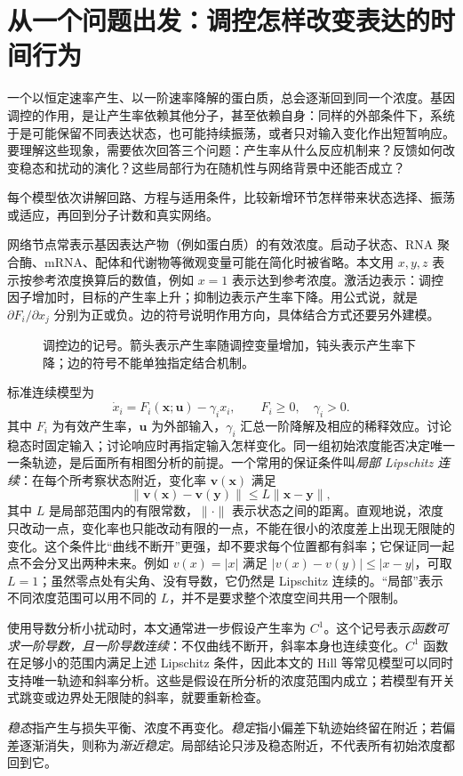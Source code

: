 \chapter{从一个问题出发：调控怎样改变表达的时间行为}
一个以恒定速率产生、以一阶速率降解的蛋白质，总会逐渐回到同一个浓度。基因调控的作用，是让产生率依赖其他分子，甚至依赖自身：同样的外部条件下，系统于是可能保留不同表达状态，也可能持续振荡，或者只对输入变化作出短暂响应。要理解这些现象，需要依次回答三个问题：产生率从什么反应机制来？反馈如何改变稳态和扰动的演化？这些局部行为在随机性与网络背景中还能否成立？

每个模型依次讲解回路、方程与适用条件，比较新增环节怎样带来状态选择、振荡或适应，再回到分子计数和真实网络。

网络节点常表示基因表达产物（例如蛋白质）的有效浓度。启动子状态、RNA 聚合酶、mRNA、配体和代谢物等微观变量可能在简化时被省略。本文用 $x,y,z$ 表示按参考浓度换算后的数值，例如 $x=1$ 表示达到参考浓度。激活边表示：调控因子增加时，目标的产生率上升；抑制边表示产生率下降。用公式说，就是 $\partial F_i/\partial x_j$ 分别为正或负。边的符号说明作用方向，具体结合方式还要另外建模。

\begin{figure}[H]\centering
{}
\caption{调控边的记号。箭头表示产生率随调控变量增加，钝头表示产生率下降；边的符号不能单独指定结合机制。}\label{fig:signs}
\end{figure}

标准连续模型为
\begin{equation}\dot x_i=F_i(\bm{x};\bm{u})-\gamma_i x_i,\qquad F_i\geq0,\quad\gamma_i>0.\end{equation}
其中 $F_i$ 为有效产生率，$\bm u$ 为外部输入，$\gamma_i$ 汇总一阶降解及相应的稀释效应。讨论稳态时固定输入；讨论响应时再指定输入怎样变化。同一组初始浓度能否决定唯一一条轨迹，是后面所有相图分析的前提。一个常用的保证条件叫\emph{局部 Lipschitz 连续}：在每个所考察状态附近，变化率 $\bm v(\bm x)$ 满足
\[
\|\bm v(\bm x)-\bm v(\bm y)\|\leq L\|\bm x-\bm y\|,
\]
其中 $L$ 是局部范围内的有限常数，$\|\cdot\|$ 表示状态之间的距离。直观地说，浓度只改动一点，变化率也只能改动有限的一点，不能在很小的浓度差上出现无限陡的变化。这个条件比“曲线不断开”更强，却不要求每个位置都有斜率；它保证同一起点不会分叉出两种未来。例如 $v(x)=|x|$ 满足 $|v(x)-v(y)|\leq|x-y|$，可取 $L=1$；虽然零点处有尖角、没有导数，它仍然是 Lipschitz 连续的。“局部”表示不同浓度范围可以用不同的 $L$，并不是要求整个浓度空间共用一个限制。

使用导数分析小扰动时，本文通常进一步假设产生率为 $C^1$。这个记号表示\emph{函数可求一阶导数，且一阶导数连续}：不仅曲线不断开，斜率本身也连续变化。$C^1$ 函数在足够小的范围内满足上述 Lipschitz 条件，因此本文的 Hill 等常见模型可以同时支持唯一轨迹和斜率分析。这些是假设在所分析的浓度范围内成立；若模型有开关式跳变或边界处无限陡的斜率，就要重新检查。

\emph{稳态}指产生与损失平衡、浓度不再变化。\emph{稳定}指小偏差下轨迹始终留在附近；若偏差逐渐消失，则称为\emph{渐近稳定}。局部结论只涉及稳态附近，不代表所有初始浓度都回到它。
